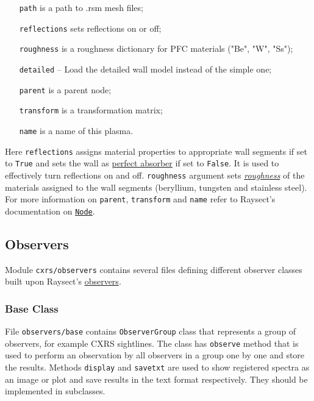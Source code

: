 \documentclass[../main.tex]{subfiles}
\begin{document}
\begin{itemize}[align=left]
    \item[\texttt{path}] is a path to .rsm mesh files;
    \item[\texttt{reflections}] sets reflections on or off;
    \item[\texttt{roughness}] is a roughness dictionary for PFC materials ("Be", "W", "Ss");
    \item[\texttt{detailed}] -- Load the detailed wall model instead of the simple one;
    \item[\texttt{parent}] is a parent node;
    \item[\texttt{transform}] is a transformation matrix;
    \item[\texttt{name}] is a name of this plasma.
\end{itemize}
Here \texttt{reflections} assigns material properties to appropriate wall segments if set to \texttt{True} and sets the wall as \href{https://raysect.github.io/documentation/api_reference/optical/optical_surfaces.html?highlight=absorber#raysect.optical.material.absorber.AbsorbingSurface}{perfect absorber} if set to \texttt{False}. It is used to effectively turn reflections on and off. \texttt{roughness} argument sets \href{https://raysect.github.io/documentation/demonstrations/materials/surface_roughness.html?highlight=rough}{\emph{roughness}} of the materials assigned to the wall segments (beryllium, tungsten and stainless steel).
For more information on \texttt{parent}, \texttt{transform} and \texttt{name} refer to Raysect's documentation on \href{https://raysect.github.io/documentation/api_reference/edge/raysect_edge_scenegraph.html?highlight=node#raysect.edge.scenegraph.node.Node}{\texttt{Node}}.

\subsection{Observers}%
\label{sec:observers}

Module \texttt{cxrs/observers} contains several files defining different observer classes built upon Raysect's \href{https://raysect.github.io/documentation/api_reference/optical/observers.html?highlight=observer}{observers}.

\subsubsection{Base Class}%
\label{sec:observers_base}

File \texttt{observers/base} contains \texttt{ObserverGroup} class that represents a group of observers, for example CXRS sightlines. The class has \texttt{observe} method that is used to perform an observation by all observers in a group one by one and store the results. Methods \texttt{display} and \texttt{savetxt} are used to show registered spectra as an image or plot and save results in the text format respectively. They should be implemented in subclasses.
\end{document}
